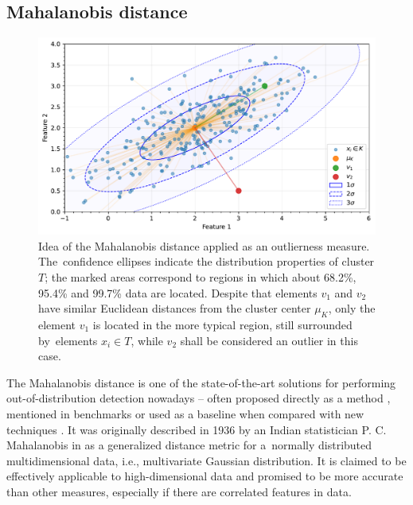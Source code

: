 \subsection{Mahalanobis distance}
\label{section:Mahalanobis}

\begin{figure}[t]
    \centering
    \includegraphics[width=\textwidth]{images/measures/mahalanobis-distance.pdf}
    \caption{Idea of the Mahalanobis distance applied as an outlierness measure.
             The~confidence ellipses indicate the distribution properties of cluster $T$;
             the marked areas correspond to regions in which about 68.2\%, 95.4\% and 99.7\%
             data are located. Despite that elements $v_1$ and $v_2$ have similar
             Euclidean distances from the cluster center $\mu_K$, only the element $v_1$
             is located in the more typical region, still surrounded by~elements $x_i \in T$,
             while $v_2$ shall be considered an outlier in this case.}
    \label{fig:md-idea}
\end{figure}

The Mahalanobis distance is one of the state-of-the-art solutions for performing out-of-distribution detection nowadays – often proposed directly as a method \cite{Lee-2018}\cite{Fort-2021}\cite{Du-2022}, mentioned in benchmarks \cite{Tajwar-2021}\cite{Zhou-2021}\cite{Podolskiy-2022}\cite{Yang-2022} or used as a baseline when compared with new techniques \cite{Liu-2020}\cite{Colombo-2022}\cite{Sun-2022}. It was originally described in 1936 by an Indian statistician P. C. Mahalanobis in \cite{Mahalanobis-1936} as a generalized distance metric for a~normally distributed multidimensional data, i.e., multivariate Gaussian distribution. It is claimed to be effectively applicable to high-dimensional data and promised to be more accurate than other measures, especially if there are correlated features in data.

